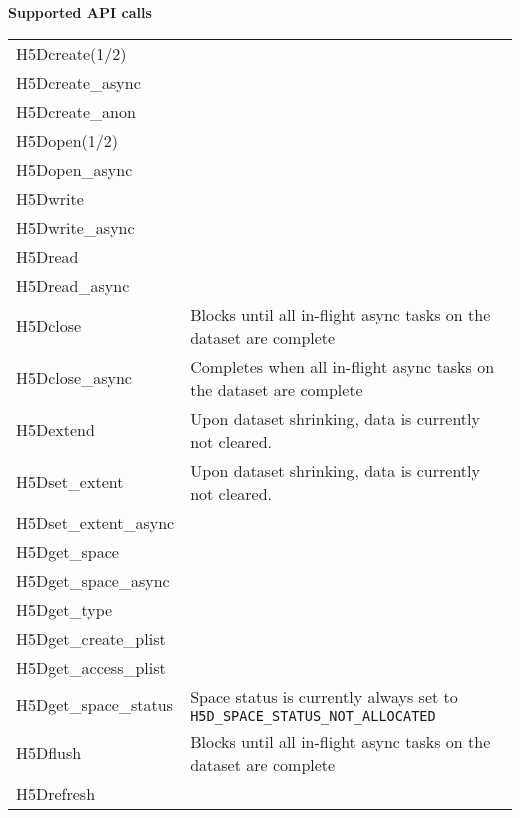 \documentclass[../users_guide.tex]{subfiles}
\begin{document}
\begin{center}

\textbf{Supported API calls}
\vspace{.2in} \\

\begin{tabularx}{\linewidth}{| X | >{\RaggedRight}X |}
\hline
\rowcolor{lightgray!50}%
\multicolumn{1}{| c |}{\textbf{API call}} & \multicolumn{1}{c |}{\textbf{Notes}} \\ \hline

H5Dcreate(1/2) & \\ \hline
H5Dcreate\_async & \\ \hline
H5Dcreate\_anon & \\ \hline
H5Dopen(1/2) & \\ \hline
H5Dopen\_async & \\ \hline
H5Dwrite & \\ \hline
H5Dwrite\_async & \\ \hline
H5Dread & \\ \hline
H5Dread\_async & \\ \hline
H5Dclose & Blocks until all in-flight async tasks on the dataset are complete\\ \hline
H5Dclose\_async & Completes when all in-flight async tasks on the dataset are complete\\ \hline
H5Dextend & Upon dataset shrinking, data is currently not cleared.\footnotemark[1]\\ \hline
H5Dset\_extent & Upon dataset shrinking, data is currently not cleared.\footnotemark[1]\\ \hline
H5Dset\_extent\_async & \\ \hline
H5Dget\_space & \\ \hline
H5Dget\_space\_async & \\ \hline
H5Dget\_type & \\ \hline
H5Dget\_create\_plist & \\ \hline
H5Dget\_access\_plist & \\ \hline
H5Dget\_space\_status & Space status is currently always set to \texttt{H5D\_SPACE\_STATUS\_NOT\_ALLOCATED}\\ \hline
H5Dflush & Blocks until all in-flight async tasks on the dataset are complete\\ \hline
H5Drefresh & \\ \hline

\end{tabularx}


\end{center}
\end{document}
